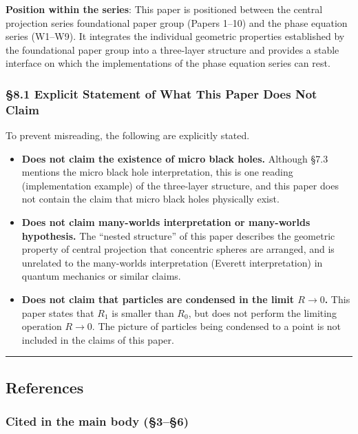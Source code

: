 \documentclass[
  a4paper,11pt]{article}
\providecommand{\tightlist}{%
  \setlength{\itemsep}{0pt}\setlength{\parskip}{0pt}}
\begin{document}
\textbf{Position within the series}: This paper is positioned between
the central projection series foundational paper group (Papers 1--10)
and the phase equation series (W1--W9). It integrates the individual
geometric properties established by the foundational paper group into a
three-layer structure and provides a stable interface on which the
implementations of the phase equation series can rest.

\subsubsection{§8.1 Explicit Statement of What This Paper Does Not
Claim}\label{explicit-statement-of-what-this-paper-does-not-claim}

To prevent misreading, the following are explicitly stated.

\begin{itemize}
\tightlist
\item
  \textbf{Does not claim the existence of micro black holes.} Although
  §7.3 mentions the micro black hole interpretation, this is one reading
  (implementation example) of the three-layer structure, and this paper
  does not contain the claim that micro black holes physically exist.
\item
  \textbf{Does not claim many-worlds interpretation or many-worlds
  hypothesis.} The ``nested structure'' of this paper describes the
  geometric property of central projection that concentric spheres are
  arranged, and is unrelated to the many-worlds interpretation (Everett
  interpretation) in quantum mechanics or similar claims.
\item
  \textbf{Does not claim that particles are condensed in the limit
  \(R \to 0\).} This paper states that \(R_1\) is smaller than \(R_0\),
  but does not perform the limiting operation \(R \to 0\). The picture
  of particles being condensed to a point is not included in the claims
  of this paper.
\end{itemize}

\begin{center}\rule{0.5\linewidth}{0.5pt}\end{center}

\subsection{References}\label{references}

\subsubsection{Cited in the main body
(§3--§6)}\label{cited-in-the-main-body-36}
\end{document}
